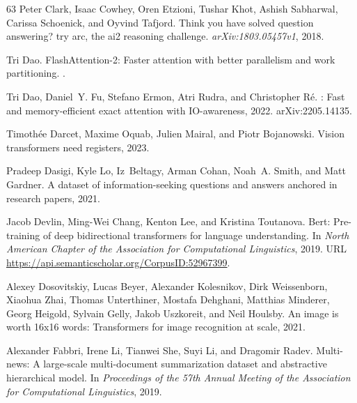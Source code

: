 \documentclass{article} \usepackage{iclr2024_conference,times}
\begin{document}
\begin{thebibliography}{63}
Peter Clark, Isaac Cowhey, Oren Etzioni, Tushar Khot, Ashish Sabharwal, Carissa
  Schoenick, and Oyvind Tafjord.
\newblock Think you have solved question answering? try arc, the ai2 reasoning
  challenge.
\newblock \emph{arXiv:1803.05457v1}, 2018.

Tri Dao.
\newblock Flash{A}ttention-2: Faster attention with better parallelism and work
  partitioning.
.

Tri Dao, Daniel~Y. Fu, Stefano Ermon, Atri Rudra, and Christopher Ré.
: Fast and memory-efficient exact attention with
  {IO}-awareness, 2022.
\newblock arXiv:2205.14135.

Timothée Darcet, Maxime Oquab, Julien Mairal, and Piotr Bojanowski.
\newblock Vision transformers need registers, 2023.

Pradeep Dasigi, Kyle Lo, Iz~Beltagy, Arman Cohan, Noah~A. Smith, and Matt
  Gardner.
\newblock A dataset of information-seeking questions and answers anchored in
  research papers, 2021.

Jacob Devlin, Ming-Wei Chang, Kenton Lee, and Kristina Toutanova.
\newblock Bert: Pre-training of deep bidirectional transformers for language
  understanding.
\newblock In \emph{North American Chapter of the Association for Computational
  Linguistics}, 2019.
\newblock URL \url{https://api.semanticscholar.org/CorpusID:52967399}.

Alexey Dosovitskiy, Lucas Beyer, Alexander Kolesnikov, Dirk Weissenborn,
  Xiaohua Zhai, Thomas Unterthiner, Mostafa Dehghani, Matthias Minderer, Georg
  Heigold, Sylvain Gelly, Jakob Uszkoreit, and Neil Houlsby.
\newblock An image is worth 16x16 words: Transformers for image recognition at
  scale, 2021.

Alexander Fabbri, Irene Li, Tianwei She, Suyi Li, and Dragomir Radev.
\newblock Multi-news: A large-scale multi-document summarization dataset and
  abstractive hierarchical model.
\newblock In \emph{Proceedings of the 57th Annual Meeting of the Association
  for Computational Linguistics}, 2019.


\end{thebibliography}
\end{document}
